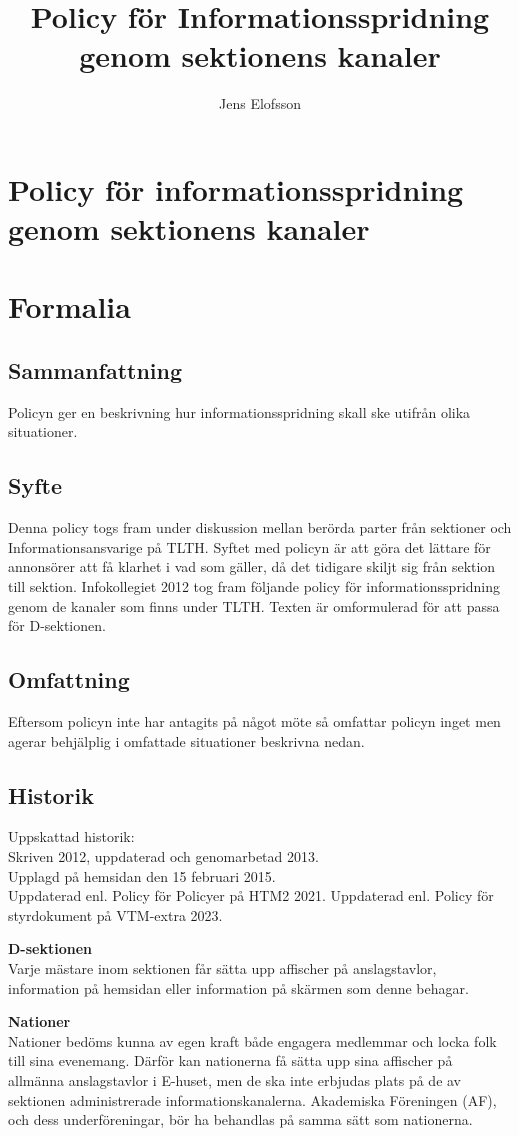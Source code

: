 \documentclass{dsekprotokoll}
\title{Policy för Informationsspridning genom sektionens kanaler}
\author{Jens Elofsson}
\begin{document}
\section*{Policy för informationsspridning genom sektionens kanaler}
\section{Formalia}
\subsection{Sammanfattning}
Policyn ger en beskrivning hur informationsspridning skall ske utifrån olika situationer.
\subsection{Syfte}
Denna policy togs fram under diskussion mellan berörda parter från sektioner och Informationsansvarige på TLTH. Syftet med policyn är att göra det lättare för annonsörer att få klarhet i vad som gäller, då det tidigare skiljt sig från sektion till sektion. Infokollegiet 2012 tog fram följande policy för informationsspridning genom de kanaler som finns under TLTH. Texten är omformulerad för att passa för D-sektionen.

\subsection{Omfattning}
Eftersom policyn inte har antagits på något möte så omfattar policyn inget men agerar behjälplig i omfattade situationer beskrivna nedan.
\subsection{Historik}
Uppskattad historik:\\
Skriven 2012, uppdaterad och genomarbetad 2013. \\
Upplagd på hemsidan den 15 februari 2015. \\
Uppdaterad enl. Policy för Policyer på HTM2 2021. Uppdaterad enl. Policy för styrdokument på VTM-extra 2023.


\textbf{D-sektionen}\\
Varje mästare inom sektionen får sätta upp affischer på anslagstavlor, information på
hemsidan eller information på skärmen som denne behagar.


\textbf{Nationer}\\
Nationer bedöms kunna av egen kraft både engagera medlemmar och locka folk till sina
evenemang. Därför kan nationerna få sätta upp sina affischer på allmänna anslagstavlor i
E-huset, men de ska inte erbjudas plats på de av sektionen administrerade informationskanalerna. Akademiska Föreningen (AF), och dess underföreningar, bör ha behandlas på
samma sätt som nationerna.
\end{document}
